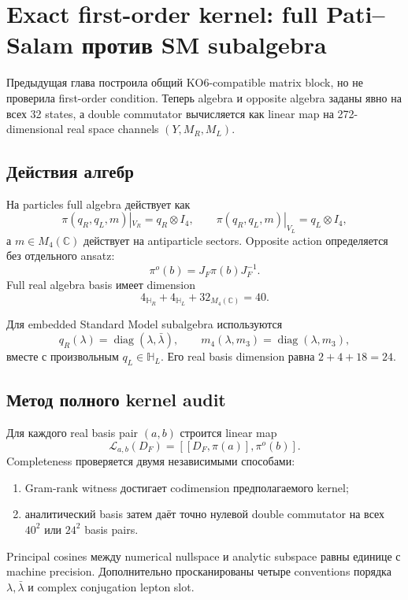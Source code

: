\chapter{Exact first-order kernel: full Pati--Salam против SM subalgebra}

Предыдущая глава построила общий KO6-compatible matrix block, но не
проверила first-order condition. Теперь algebra и opposite algebra заданы
явно на всех 32 states, а double commutator вычисляется как linear map на
272-dimensional real space channels \((Y,M_R,M_L)\).

\section{Действия алгебр}

На particles full algebra действует как
\begin{equation}
 \pi(q_R,q_L,m)|_{V_R}=q_R\otimes I_4,
 \qquad
 \pi(q_R,q_L,m)|_{V_L}=q_L\otimes I_4,
\end{equation}
а \(m\in M_4(\mathbb C)\) действует на antiparticle sectors. Opposite
action определяется без отдельного ansatz:
\begin{equation}
 \pi^o(b)=J_F\pi(b)J_F^{-1}.
\end{equation}
Full real algebra basis имеет dimension
\begin{equation}
 4_{\mathbb H_R}+4_{\mathbb H_L}+32_{M_4(\mathbb C)}=40.
\end{equation}

Для embedded Standard Model subalgebra используются
\begin{equation}
 q_R(\lambda)=\operatorname{diag}(\lambda,\bar\lambda),
 \qquad
 m_4(\lambda,m_3)=\operatorname{diag}(\lambda,m_3),
\end{equation}
вместе с произвольным \(q_L\in\mathbb H_L\). Его real basis dimension равна
\(2+4+18=24\).

\section{Метод полного kernel audit}

Для каждого real basis pair \((a,b)\) строится linear map
\begin{equation}
 \mathcal L_{a,b}(D_F)
 =[[D_F,\pi(a)],\pi^o(b)].
\end{equation}
Completeness проверяется двумя независимыми способами:
\begin{enumerate}
 \item Gram-rank witness достигает codimension предполагаемого kernel;
 \item аналитический basis затем даёт точно нулевой double commutator на
 всех \(40^2\) или \(24^2\) basis pairs.
\end{enumerate}
Principal cosines между numerical nullspace и analytic subspace равны
единице с machine precision. Дополнительно просканированы четыре conventions
порядка \(\lambda,\bar\lambda\) и complex conjugation lepton slot.

